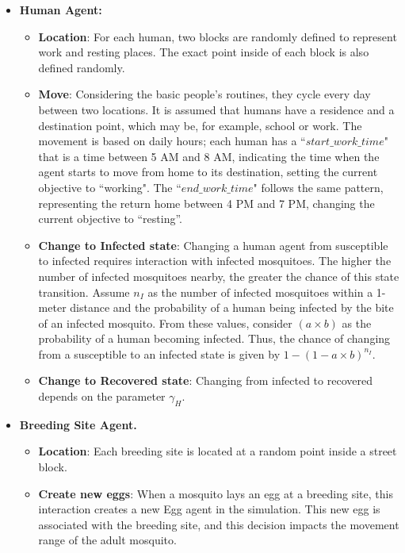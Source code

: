 \begin{itemize}
	\item \textbf{Human Agent:}
	      \begin{itemize}
		      \item \textbf{Location}: For each human, two blocks are randomly defined to
		            represent work and resting places. The exact point inside of each block is
		            also defined randomly.
		      \item \textbf{Move}: Considering the basic people's routines, they cycle
		            every day between two locations. It is assumed that humans have a residence
		            and a destination point, which may be, for example, school or work. The
		            movement is based on daily hours; each human has a ``$start\_work\_time$"
		            that is a time between 5 AM and 8 AM, indicating the time when the agent
		            starts to move from home to its destination, setting the current objective
		            to ``working". The ``$end\_work\_time$" follows the same pattern,
		            representing the return home between 4 PM and 7 PM, changing the current
		            objective to ``resting''.
		      \item \textbf{Change to Infected state}: Changing a human agent from
		            susceptible to infected requires interaction with infected mosquitoes. The
		            higher the number of infected mosquitoes nearby, the greater the chance of
		            this state transition. Assume $n_I$ as the number of infected mosquitoes
		            within a 1-meter distance and the probability of a human being infected by
		            the bite of an infected mosquito. From these values, consider $(a \times b)$
		            as the probability of a human becoming infected. Thus, the chance of
		            changing from a susceptible to an infected state is given by $1 - (1 - a
			            \times b)^{n_{I}}$.
		      \item  \textbf{Change to Recovered state}: Changing from infected to
		            recovered depends on the parameter $\gamma_H$.
	      \end{itemize}

	\item \textbf{Breeding Site Agent.}
	      \begin{itemize}
		      \item \textbf{Location}: Each breeding site is located at a random point
		            inside a street block.
		      \item \textbf{Create new eggs}: When a mosquito lays an egg at a breeding
		            site, this interaction creates a new Egg agent in the simulation. This new
		            egg is associated with the breeding site, and this decision impacts the
		            movement range of the adult mosquito.
	      \end{itemize}


\end{itemize}
